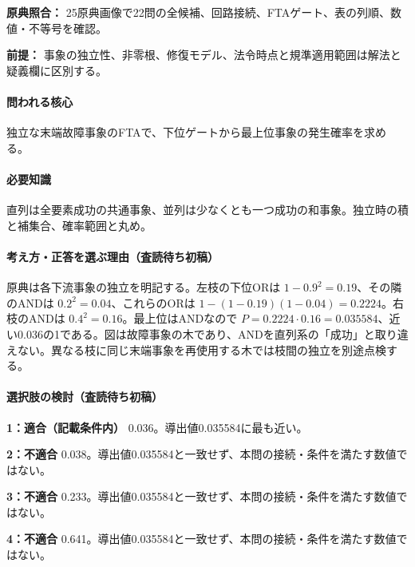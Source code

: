 \noindent\textbf{原典照合：} 25原典画像で22問の全候補、回路接続、FTAゲート、表の列順、数値・不等号を確認。\par

\noindent\textbf{前提：} 事象の独立性、非零根、修復モデル、法令時点と規準適用範囲は解法と疑義欄に区別する。\par

\paragraph{問われる核心} 独立な末端故障事象のFTAで、下位ゲートから最上位事象の発生確率を求める。

\paragraph{必要知識} 直列は全要素成功の共通事象、並列は少なくとも一つ成功の和事象。独立時の積と補集合、確率範囲と丸め。

\paragraph{考え方・正答を選ぶ理由（査読待ち初稿）} 原典は各下流事象の独立を明記する。左枝の下位ORは \(1-0.9^2=0.19\)、その隣のANDは \(0.2^2=0.04\)、これらのORは \(1-(1-0.19)(1-0.04)=0.2224\)。右枝のANDは \(0.4^2=0.16\)。最上位はANDなので \(P=0.2224\cdot0.16=0.035584\)、近い0.036の1である。図は故障事象の木であり、ANDを直列系の「成功」と取り違えない。異なる枝に同じ末端事象を再使用する木では枝間の独立を別途点検する。

\paragraph{選択肢の検討（査読待ち初稿）}\mbox{}\par

\noindent\textbf{1：適合（記載条件内）} 0.036。導出値0.035584に最も近い。\par

\noindent\textbf{2：不適合} 0.038。導出値0.035584と一致せず、本問の接続・条件を満たす数値ではない。\par

\noindent\textbf{3：不適合} 0.233。導出値0.035584と一致せず、本問の接続・条件を満たす数値ではない。\par

\noindent\textbf{4：不適合} 0.641。導出値0.035584と一致せず、本問の接続・条件を満たす数値ではない。\par


